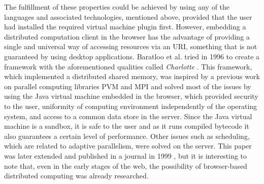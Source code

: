 \documentclass[journal,onecolumn]{IEEEtran}
\begin{document}
The fulfillment of these properties could be achieved by using any of the
languages and associated technologies, mentioned above, provided that the user had
installed the required virtual machine plugin first. 
However, embedding a
distributed computation client in the browser has the advantage of
providing a single and universal way of accessing resources via an
URI, something that is not guaranteed by using desktop applications. 
Baratloo et al. tried in 1996 to create a framework with
the aforementioned qualities called {\em Charlotte}
\cite{baratloo1996charlotte}. This framework, which implemented a
distributed shared memory, was inspired by a previous work
on parallel computing libraries PVM and MPI and solved most of the issues by
using the Java virtual machine embedded in the browser,
which provided
security to the user, uniformity of computing environment
independently of the operating system, and access to a common data store in the
server. Since the Java virtual machine is a sandbox, it is safe to the user
and as it runs compiled bytecode it also guarantees a certain level of
performance.
Other issues such as scheduling, which are related to adaptive 
parallelism, were solved on the server. This
paper was later extended and published in a journal in 1999
\cite{baratloo1999charlotte}, but it is interesting to note that,
even in the early stages of the web, the possibility of
browser-based distributed computing was already researched. 
\end{document}
